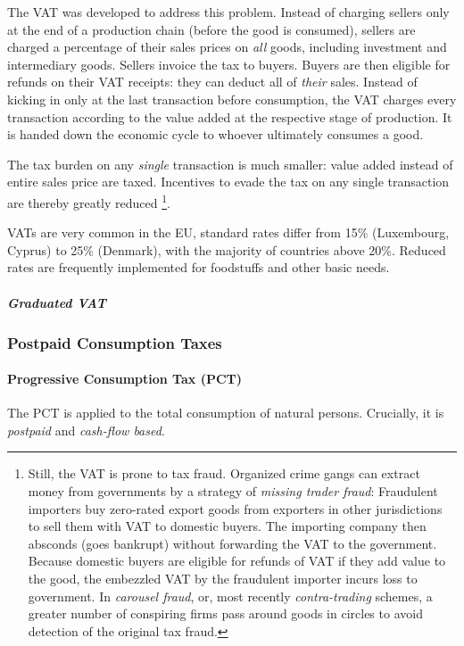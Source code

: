 The VAT was developed to address this problem.
Instead of charging sellers only at the end of a production chain (before the good is consumed), sellers are charged a percentage of their sales prices on \emph{all} goods, including investment and intermediary goods.
Sellers invoice the tax to buyers.
Buyers are then eligible for refunds on their VAT receipts:
they can deduct all of \emph{their} sales.
Instead of kicking in only at the last transaction before consumption, the VAT charges every transaction according to the value added at the respective stage of production.
It is handed down the economic cycle to whoever ultimately consumes a good.

The tax burden on any \emph{single} transaction is much smaller:
value added instead of entire sales price are taxed.
Incentives to evade the tax on any single transaction are thereby greatly reduced
\footnote{
	Still, the VAT is prone to tax fraud.
	Organized crime gangs can extract money from governments by a strategy of \emph{missing trader fraud}:
	Fraudulent importers buy zero-rated export goods from exporters in other jurisdictions to sell them with VAT to domestic buyers.
	The importing company then absconds (goes bankrupt) without forwarding the VAT to the government.
	Because domestic buyers are eligible for refunds of VAT if they add value to the good, the embezzled VAT by the fraudulent importer incurs loss to government.
	In \emph{carousel fraud}, or, most recently \emph{contra-trading} schemes, a greater number of conspiring firms pass around goods in circles to avoid detection of the original tax fraud.
}.

VATs are very common in the EU, standard rates differ from 15\% (Luxembourg, Cyprus) to 25\% (Denmark), with the majority of countries above 20\%.
Reduced rates are frequently implemented for foodstuffs and other basic needs.

\subparagraph{Graduated VAT}

\subsubsection{Postpaid Consumption Taxes}

\paragraph{Progressive Consumption Tax (PCT)} \label{sec:PCT}  The \gls{PCT} is applied to the total consumption of natural persons.
Crucially, it is \emph{postpaid} and \emph{cash-flow based}.

